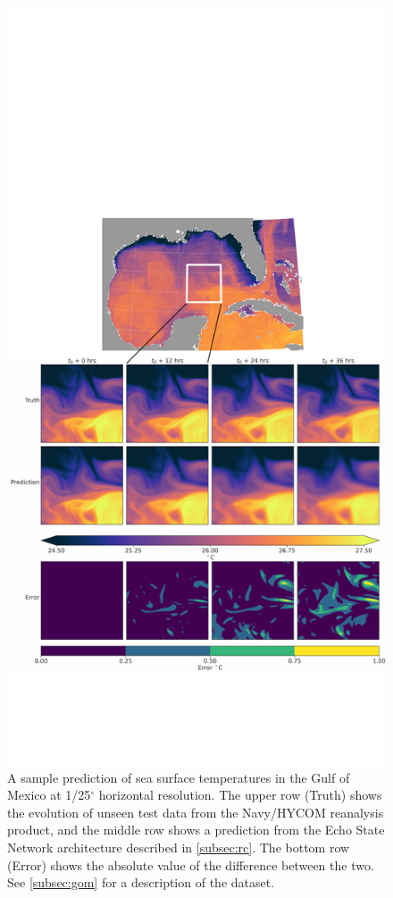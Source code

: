 \begin{figure}
    \centering
    \includegraphics[width=.8\textwidth]{../figures/rc_gom_sst.pdf}
    \caption{A sample prediction of sea surface temperatures in the Gulf of Mexico at 1/25$^\circ$
        horizontal resolution.
        The upper row (Truth) shows the evolution of unseen test data from the
        Navy/HYCOM reanalysis product, and the middle row shows a prediction
        from the Echo State Network architecture described in
        \cref{subsec:rc}.
        The bottom row (Error) shows the absolute value of the difference between the two.
        See \cref{subsec:gom} for a description of the dataset.
    }
    \label{fig:gom_sst}
\end{figure}

